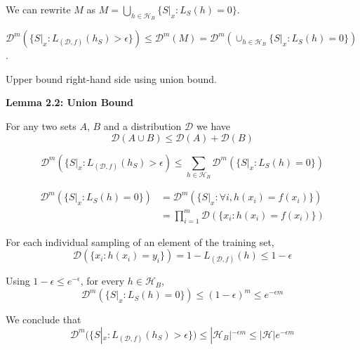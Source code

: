 We can rewrite $M$ as $M = \bigcup_{h \in \mathcal{H}_B} \{S |_x : L_S(h) = 0\}$.

$\mathcal{D}^m(\{S |_x : L_{(\mathcal{D}, f)} (h_S) > \epsilon \}) \leq \mathcal{D}^m (M) = \mathcal{D}^m (\cup_{h \in \mathcal{H}_B} \{S |_x : L_S(h) = 0 \})$.

Upper bound right-hand side using union bound.

\bigskip

\textbf{Lemma 2.2: Union Bound}

For any two sets $A$, $B$ and a distribution $\mathcal{D}$ we have
    $$\mathcal{D}(A \cup B) \leq \mathcal{D}(A) + \mathcal{D}(B)$$

$$\mathcal{D}^m(\{S |_x : L_{(\mathcal{D}, f)} (h_S) > \epsilon) \leq \sum_{h \in \mathcal{H}_B} \mathcal{D}^m ( \{ S|_x : L_S(h) = 0 \})$$

\begin{equation*}
    \begin{aligned}
        \mathcal{D}^m (\{S |_x : L_S(h) = 0 \}) 
        &= \mathcal{D}^m(\{S|_x : \forall i, h(x_i) = f(x_i) \}) \\
        &= \prod_{i=1}^m \mathcal{D}(\{x_i : h(x_i) = f(x_i) \})
    \end{aligned}
\end{equation*}

For each individual sampling of an element of the training set,
$$\mathcal{D}(\{x_i : h(x_i) = y_i\}) = 1 - L_{(\mathcal{D}, f)}(h) \leq 1 - \epsilon$$

Using $1 - \epsilon \leq e^{-\epsilon}$, for every $h \in \mathcal{H}_B$,
$$\mathcal{D}^m(\{S|_x : L_S(h) = 0 \}) \leq (1-\epsilon)^m \leq e^{-\epsilon m}$$

We conclude that 
$$\mathcal{D}^m(\{S|_x : L_{(\mathcal{D}, f)}(h_S) > \epsilon \}) \leq |\mathcal{H}_B|^{-\epsilon m} \leq |\mathcal{H}| e^{-\epsilon m}$$